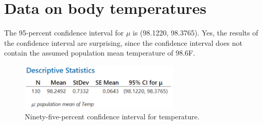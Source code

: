 \documentclass[12pt]{article}
\newcommand{\degreeF}{\degree F}
\begin{document}
\section{Data on body temperatures}
The 95-percent confidence interval for $\mu$ is (98.1220, 98.3765). Yes, the results of the confidence interval are surprising, since the confidence interval does not contain the assumed population mean temperature of 98.6\degreeF.
\begin{figure}[h]
\begin{center}
\includegraphics[width=3in]{images/temperature-confidence-interval.png}
\end{center}
\caption{Ninety-five-percent confidence interval for temperature.}
\end{figure}
\end{document}
